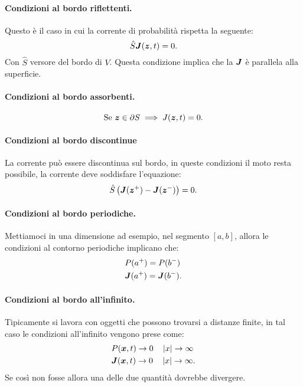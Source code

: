 \paragraph{Condizioni al bordo riflettenti.}%
Questo è il caso in cui la corrente di probabilità rispetta la seguente:
\[
    \hat{S}\boldsymbol{J} (\boldsymbol{z}, t) = 0
.\] 
Con $\hat{S}$ versore del bordo di $V$. Questa condizione implica che la $\boldsymbol{J}$ è parallela alla superficie.
\paragraph{Condizioni al bordo assorbenti.}%
\[
    \text{Se }\boldsymbol{z}  \in \partial S \implies  J(\boldsymbol{z}, t) = 0
.\] 
\paragraph{Condizioni al bordo discontinue}%
La corrente può essere discontinua sul bordo, in queste condizioni il moto resta possibile, la corrente deve soddisfare l'equazione:
\[
    \hat{S}\left(\boldsymbol{J} (\boldsymbol{z}^+) - \boldsymbol{J} (\boldsymbol{z}^-) \right) = 0
.\] 
\paragraph{Condizioni al bordo periodiche.}%
Mettiamoci in una dimensione ad esempio, nel segmento $\left[a, b\right]$, allora le condizioni al contorno periodiche implicano che:
\[\begin{aligned}
    & P(a^+) = P(b^-) \\
    & \boldsymbol{J} (a^+) = \boldsymbol{J} (b^-) 
.\end{aligned}\]
\paragraph{Condizioni al bordo all'infinito.}%
Tipicamente si lavora con oggetti che possono trovarsi a distanze finite, in tal caso le condizioni all'infinito vengono prese come:
\[\begin{aligned}
    & P(\boldsymbol{x}, t) \to 0 \quad \left|x\right|\to \infty\\
    & \boldsymbol{J} (\boldsymbol{x}, t) \to 0 \quad \left|x\right|\to \infty
.\end{aligned}\]
Se così non fosse allora una delle due quantità dovrebbe divergere.
